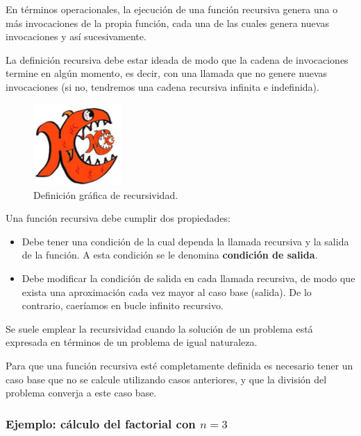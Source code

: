 \documentclass[a4paper, 11pt, titlepage]{article}
\begin{document}
        En términos operacionales, la ejecución de una función recursiva genera una o más invocaciones 
        de la propia función, cada una de las cuales genera nuevas invocaciones y así sucesivamente.

        La definición recursiva debe estar ideada de modo que la cadena de invocaciones termine 
        en algún momento, es decir, con una llamada que no genere nuevas invocaciones (si no, tendremos 
        una cadena recursiva infinita e indefinida).
    
        \begin{figure}[htp]
            \centering
            \includegraphics[width=0.3\textwidth]{resources/recursividad.jpg}
            \caption{Definición gráfica de recursividad.}
            \label{recursividad01}
        \end{figure}

        Una función recursiva debe cumplir dos propiedades:

        \begin{itemize}
            \item Debe tener una condición de la cual dependa la llamada recursiva y la salida de la 
            función. A esta condición se le denomina \textbf{condición de salida}.
            \item Debe modificar la condición de salida en cada llamada recursiva, de modo que exista 
            una aproximación cada vez mayor al caso base (salida). De lo contrario, caeríamos en 
            bucle infinito recursivo.
        \end{itemize}

        Se suele emplear la recursividad cuando la solución de un problema está expresada en términos 
        de un problema de igual naturaleza.

        Para que una función recursiva esté completamente definida es necesario tener un caso base 
        que no se calcule utilizando casos anteriores, y que la división del problema converja a este 
        caso base.

        \subsubsection{Ejemplo: cálculo del factorial con $n=3$}\label{factorial}
\end{document}
